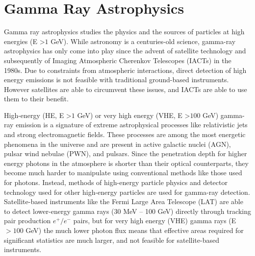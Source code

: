 \documentclass[main.tex]{subfiles}
\begin{document}
\section{Gamma Ray Astrophysics}
Gamma ray astrophysics studies the physics and the sources of particles at high energies (E >$1$ GeV). While astronomy is a centuries-old science, gamma-ray astrophysics has only come into play since the advent of satellite technology and subsequently of Imaging Atmospheric Cherenkov Telescopes (IACTs) in the 1980s. Due to constraints from atmospheric interactions, direct detection of high energy emissions is not feasible with traditional ground-based instruments. However satellites are able to circumvent these issues, and IACTs are able to use them to their benefit.\par

High-energy (HE, E >$1$ GeV) or very high energy (VHE, E >$100$ GeV) gamma-ray emission is a signature of extreme astrophysical processes like relativistic jets and strong electromagnetic fields. These processes are among the most energetic phenomena in the universe and are present in active galactic nuclei (AGN), pulsar wind nebulae (PWN), and pulsars. Since the penetration depth for higher energy photons in the atmosphere is shorter than their optical counterparts, they become much harder to manipulate using conventional methods like those used for photons. Instead, methods of high-energy particle physics and detector technology used for other high-energy particles are used for gamma-ray detection. Satellite-based instruments like the Fermi Large Area Telescope (LAT) are able to detect lower-energy gamma rays (30 MeV -- 100 GeV) directly through tracking pair production $e^+/e^-$ pairs, but for very high energy (VHE) gamma rays (E$> 100$ GeV) the much lower photon flux means that effective areas required for significant statistics are much larger, and not feasible for satellite-based instruments.
\end{document}

